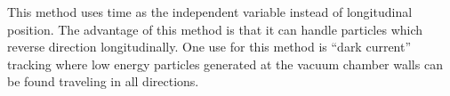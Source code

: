 \begin{description}
\item[\vn{Time_Runge_Kutta}]
This method uses time as the independent variable instead of
longitudinal position. The advantage of this method is that it can
handle particles which reverse direction longitudinally.  One use for
this method is ``dark current'' tracking where low energy particles
generated at the vacuum chamber walls can be found traveling in all
directions.

\end{description}


